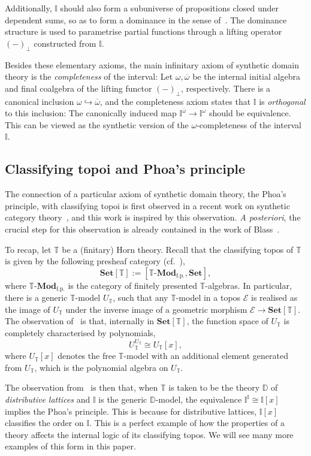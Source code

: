 \documentclass[12pt]{amsart}
\theoremstyle{definition}
\newcommand{\mc}[1]{\mathcal{#1}}
\newcommand{\mb}[1]{\mathbf{#1}}
\newcommand{\mbb}[1]{\mathbb{#1}}
\newcommand{\T}{\mbb T}
\newcommand{\I}{\mbb I}
\newcommand{\mr}[1]{\mathrm{#1}}
\newcommand{\Set}{\mb{Set}}
\newcommand{\ov}[1]{\overline{#1}}
\newcommand{\hook}{\hookrightarrow}
\newcommand{\fp}{_{\mr{f.p.}}}
\newcommand{\prt}{_{\bot}}
\newcommand{\mmod}[1]{#1\text{-}\mathbf{Mod}}
\begin{document}
Additionally, $\I$ should also form a subuniverse of propositions closed under dependent sums, so as to form a dominance in the sense of~\cite{rosolini1986continuity}. The dominance structure is used to parametrise partial functions through a lifting operator $(-)\prt$ constructed from $\I$. 

Besides these elementary axioms, the main infinitary axiom of synthetic domain theory is the \emph{completeness} of the interval: Let $\omega,\ov\omega$ be the internal initial algebra and final coalgebra of the lifting functor $(-)\prt$, respectively. There is a canonical inclusion $\omega \hook \ov\omega$, and the completeness axiom states that $\I$ is \emph{orthogonal} to this inclusion: The canonically induced map $\I^{\ov\omega} \to \I^{\omega}$ should be equivalence. This can be viewed as the synthetic version of the $\omega$-completeness of the interval $\I$.

\subsection{Classifying topoi and Phoa's principle}\label{subsec:classtopphoa}

The connection of a particular axiom of synthetic domain theory, the Phoa's principle, with classifying topoi is first observed in a recent work on synthetic category theory~\cite{gratzer2024directed}, and this work is inspired by this observation. \emph{A posteriori}, the crucial step for this observation is already contained in the work of Blass~\cite{RN879}. 

To recap, let $\T$ be a (finitary) Horn theory. Recall that the classifying topos of $\T$ is given by the following presheaf category (cf.~\cite[D3.1]{johnstone2002sketches}),
\[ \Set[\T] := [\mmod\T\fp,\Set], \]
where $\mmod\T\fp$ is the category of finitely presented $\T$-algebras. In particular, there is a generic $\T$-model $U_\T$, such that any $\T$-model in a topos $\mc E$ is realised as the image of $U_\T$ under the inverse image of a geometric morphism $\mc E \to \Set[\T]$. The observation of~\cite{RN879} is that, internally in $\Set[\T]$, the function space of $U_\T$ is completely characterised by polynomials,
\[ U_\T^{U_\T} \cong U_\T[x], \]
where $U_\T[x]$ denotes the free $\T$-model with an additional element generated from $U_\T$, which is the polynomial algebra on $U_\T$.

The observation from~\cite{gratzer2024directed} is then that, when $\T$ is taken to be the theory $\mbb D$ of \emph{distributive lattices} and $\I$ is the generic $\mbb D$-model, the equivalence $\I^\I \cong \I[x]$ implies the Phoa's principle. This is because for distributive lattices, $\I[x]$ classifies the order on $\I$. This is a perfect example of how the properties of a theory affects the internal logic of its classifying topos. We will see many more examples of this form in this paper.
\end{document}
